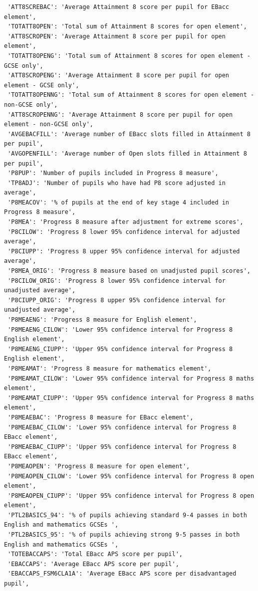 \documentclass[
  letterpaper,
  DIV=11,
  numbers=noendperiod]{scrartcl}
\begin{document}
\begin{verbatim}
 'ATT8SCREBAC': 'Average Attainment 8 score per pupil for EBacc element',
 'TOTATT8OPEN': 'Total sum of Attainment 8 scores for open element',
 'ATT8SCROPEN': 'Average Attainment 8 score per pupil for open element',
 'TOTATT8OPENG': 'Total sum of Attainment 8 scores for open element - GCSE only',
 'ATT8SCROPENG': 'Average Attainment 8 score per pupil for open element - GCSE only',
 'TOTATT8OPENNG': 'Total sum of Attainment 8 scores for open element - non-GCSE only',
 'ATT8SCROPENNG': 'Average Attainment 8 score per pupil for open element - non-GCSE only',
 'AVGEBACFILL': 'Average number of EBacc slots filled in Attainment 8 per pupil',
 'AVGOPENFILL': 'Average number of Open slots filled in Attainment 8 per pupil',
 'P8PUP': 'Number of pupils included in Progress 8 measure',
 'TP8ADJ': 'Number of pupils who have had P8 score adjusted in average',
 'P8MEACOV': '% of pupils at the end of key stage 4 included in Progress 8 measure',
 'P8MEA': 'Progress 8 measure after adjustment for extreme scores',
 'P8CILOW': 'Progress 8 lower 95% confidence interval for adjusted average',
 'P8CIUPP': 'Progress 8 upper 95% confidence interval for adjusted average',
 'P8MEA_ORIG': 'Progress 8 measure based on unadjusted pupil scores',
 'P8CILOW_ORIG': 'Progress 8 lower 95% confidence interval for unadjusted average',
 'P8CIUPP_ORIG': 'Progress 8 upper 95% confidence interval for unadjusted average',
 'P8MEAENG': 'Progress 8 measure for English element',
 'P8MEAENG_CILOW': 'Lower 95% confidence interval for Progress 8 English element',
 'P8MEAENG_CIUPP': 'Upper 95% confidence interval for Progress 8 English element',
 'P8MEAMAT': 'Progress 8 measure for mathematics element',
 'P8MEAMAT_CILOW': 'Lower 95% confidence interval for Progress 8 maths element',
 'P8MEAMAT_CIUPP': 'Upper 95% confidence interval for Progress 8 maths element',
 'P8MEAEBAC': 'Progress 8 measure for EBacc element',
 'P8MEAEBAC_CILOW': 'Lower 95% confidence interval for Progress 8 EBacc element',
 'P8MEAEBAC_CIUPP': 'Upper 95% confidence interval for Progress 8 EBacc element',
 'P8MEAOPEN': 'Progress 8 measure for open element',
 'P8MEAOPEN_CILOW': 'Lower 95% confidence interval for Progress 8 open element',
 'P8MEAOPEN_CIUPP': 'Upper 95% confidence interval for Progress 8 open element',
 'PTL2BASICS_94': '% of pupils achieving standard 9-4 passes in both English and mathematics GCSEs ',
 'PTL2BASICS_95': '% of pupils achieving strong 9-5 passes in both English and mathematics GCSEs ',
 'TOTEBACCAPS': 'Total EBacc APS score per pupil',
 'EBACCAPS': 'Average EBacc APS score per pupil',
 'EBACCAPS_FSM6CLA1A': 'Average EBacc APS score per disadvantaged pupil',

\end{verbatim}
\end{document}
